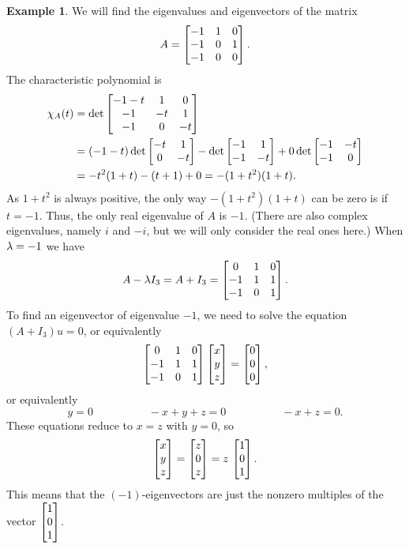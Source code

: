 \documentclass[reqno]{amsart}
\theoremstyle{definition}
\newtheorem{example}[theorem]{Example}
\begin{document}
\begin{example}\label{eg-eigen-iii}
 We will find the eigenvalues and eigenvectors of the matrix
 \[ A = \left[\begin{matrix} -1 & 1 & 0 \\ -1 & 0 & 1 \\ -1 & 0 & 0 \end{matrix}\right]. \]
 The characteristic polynomial is
 \begin{align*}
  \chi_A(t) &=
   \det\left[\begin{matrix} -1-t & 1 & 0 \\ -1 & -t &  1 \\ -1 & 0 & -t \end{matrix}\right] \\
   &= (-1-t)\det\left[\begin{matrix} -t & 1 \\ 0 & -t \end{matrix}\right]
      - \det\left[\begin{matrix} -1 & 1 \\ -1 & -t \end{matrix}\right]
      + 0 \det \left[\begin{matrix} -1 & -t \\ -1 & 0 \end{matrix}\right] \\
   &= -t^2(1+t) - (t+1) + 0 = -(1+t^2)(1+t).
 \end{align*}
 As $1+t^2$ is always positive, the only way $-(1+t^2)(1+t)$ can be
 zero is if $t=-1$.  Thus, the only real eigenvalue of $A$ is $-1$.
 (There are also complex eigenvalues, namely $i$ and $-i$, but we will
 only consider the real ones here.) When $\lambda=-1$ we have
 \[ A - \lambda I_3 = A + I_3 =
     \left[\begin{matrix} 0 & 1 & 0 \\ -1 & 1 & 1 \\ -1 & 0 & 1 \end{matrix}\right].
 \]
 To find an eigenvector of eigenvalue $-1$, we need to solve the
 equation $(A+I_3)u=0$, or equivalently
 \[ \left[\begin{matrix} 0 & 1 & 0 \\ -1 & 1 & 1 \\ -1 & 0 & 1 \end{matrix}\right]
     \left[\begin{matrix} x \\ y \\ z \end{matrix}\right] = \left[\begin{matrix} 0 \\ 0 \\ 0 \end{matrix}\right],
 \]
 or equivalently
 \[ y=0 \hspace{5em} -x+y+z = 0 \hspace{5em} -x + z = 0. \]
 These equations reduce to $x=z$ with $y=0$, so
 \[ \left[\begin{matrix} x\\ y\\ z\end{matrix}\right] = \left[\begin{matrix} z \\ 0 \\ z\end{matrix}\right] =
      z\,\left[\begin{matrix} 1 \\ 0 \\ 1\end{matrix}\right].
 \]
 This means that the $(-1)$-eigenvectors are just the nonzero
 multiples of the vector $\left[\begin{matrix} 1\\ 0 \\ 1\end{matrix}\right]$.
\end{example}
\end{document}
